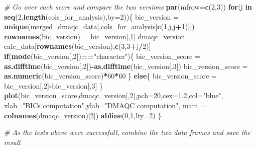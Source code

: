 \documentclass[]{article}
\newenvironment{Shaded}{\begin{snugshade}}{\end{snugshade}}
\newcommand{\KeywordTok}[1]{\textcolor[rgb]{0.13,0.29,0.53}{\textbf{#1}}}
\newcommand{\DataTypeTok}[1]{\textcolor[rgb]{0.13,0.29,0.53}{#1}}
\newcommand{\DecValTok}[1]{\textcolor[rgb]{0.00,0.00,0.81}{#1}}
\newcommand{\FloatTok}[1]{\textcolor[rgb]{0.00,0.00,0.81}{#1}}
\newcommand{\StringTok}[1]{\textcolor[rgb]{0.31,0.60,0.02}{#1}}
\newcommand{\CommentTok}[1]{\textcolor[rgb]{0.56,0.35,0.01}{\textit{#1}}}
\newcommand{\ControlFlowTok}[1]{\textcolor[rgb]{0.13,0.29,0.53}{\textbf{#1}}}
\newcommand{\OperatorTok}[1]{\textcolor[rgb]{0.81,0.36,0.00}{\textbf{#1}}}
\newcommand{\NormalTok}[1]{#1}
\begin{document}
\begin{Shaded}
\begin{Highlighting}[]
\CommentTok{# Go over each score and compare the two versions}
\KeywordTok{par}\NormalTok{(}\DataTypeTok{mfrow=}\KeywordTok{c}\NormalTok{(}\DecValTok{2}\NormalTok{,}\DecValTok{3}\NormalTok{))}
\ControlFlowTok{for}\NormalTok{(j }\ControlFlowTok{in} \KeywordTok{seq}\NormalTok{(}\DecValTok{2}\NormalTok{,}\KeywordTok{length}\NormalTok{(cols_for_analysis),}\DataTypeTok{by=}\DecValTok{2}\NormalTok{))\{}
\NormalTok{  bic_version =}\StringTok{ }\KeywordTok{unique}\NormalTok{(merged_dmaqc_data[,cols_for_analysis[}\KeywordTok{c}\NormalTok{(}\DecValTok{1}\NormalTok{,j,j}\OperatorTok{+}\DecValTok{1}\NormalTok{)]])}
  \KeywordTok{rownames}\NormalTok{(bic_version) =}\StringTok{ }\NormalTok{bic_version[,}\DecValTok{1}\NormalTok{]}
\NormalTok{  dmaqc_version =}\StringTok{ }\NormalTok{calc_data[}\KeywordTok{rownames}\NormalTok{(bic_version),}\KeywordTok{c}\NormalTok{(}\DecValTok{3}\NormalTok{,}\DecValTok{3}\OperatorTok{+}\NormalTok{j}\OperatorTok{/}\DecValTok{2}\NormalTok{)]}
  \ControlFlowTok{if}\NormalTok{(}\KeywordTok{mode}\NormalTok{(bic_version[,}\DecValTok{2}\NormalTok{])}\OperatorTok{==}\StringTok{"character"}\NormalTok{)\{}
\NormalTok{    bic_version_score =}\StringTok{ }\KeywordTok{as.difftime}\NormalTok{(bic_version[,}\DecValTok{2}\NormalTok{])}\OperatorTok{-}\KeywordTok{as.difftime}\NormalTok{(bic_version[,}\DecValTok{3}\NormalTok{])}
\NormalTok{    bic_version_score =}\StringTok{ }\KeywordTok{as.numeric}\NormalTok{(bic_version_score)}\OperatorTok{*}\DecValTok{60}\OperatorTok{*}\DecValTok{60}
\NormalTok{  \}}
  \ControlFlowTok{else}\NormalTok{\{}
\NormalTok{    bic_version_score =}\StringTok{ }\NormalTok{bic_version[,}\DecValTok{2}\NormalTok{]}\OperatorTok{-}\NormalTok{bic_version[,}\DecValTok{3}\NormalTok{]}
\NormalTok{  \}}
  \KeywordTok{plot}\NormalTok{(bic_version_score,dmaqc_version[,}\DecValTok{2}\NormalTok{],}\DataTypeTok{pch=}\DecValTok{20}\NormalTok{,}\DataTypeTok{cex=}\FloatTok{1.2}\NormalTok{,}\DataTypeTok{col=}\StringTok{"blue"}\NormalTok{,}
       \DataTypeTok{xlab=}\StringTok{"BICs computation"}\NormalTok{,}\DataTypeTok{ylab=}\StringTok{"DMAQC computation"}\NormalTok{,}
       \DataTypeTok{main =} \KeywordTok{colnames}\NormalTok{(dmaqc_version)[}\DecValTok{2}\NormalTok{])}
  \KeywordTok{abline}\NormalTok{(}\DecValTok{0}\NormalTok{,}\DecValTok{1}\NormalTok{,}\DataTypeTok{lty=}\DecValTok{2}\NormalTok{)}
\NormalTok{\}}

\CommentTok{# As the tests above were successfull, combine the two data frames and save the result}
\end{Highlighting}
\end{Shaded}
\end{document}
